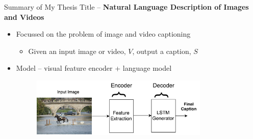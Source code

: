 \documentclass{beamer}
\begin{document}
\begin{frame}{Summary of My Thesis}
        Title -- \textbf{Natural Language Description of Images and Videos}
\begin{itemize}
\item Focussed on the problem of image and video captioning 
    \begin{itemize}
         \item Given an input image or video, $V$, output a caption, $S$
    \end{itemize}
\item Model -- visual feature encoder + language model 
        \begin{figure}[h]
            \centering
            \includegraphics[width=0.8\textwidth]{images/EncDec.pdf}
        \end{figure}
\end{itemize}
\end{frame}
\end{document}
